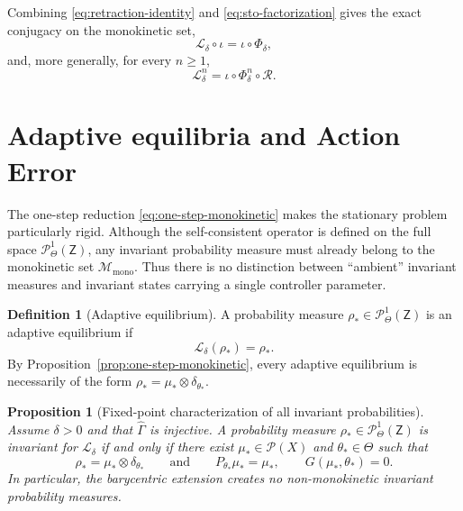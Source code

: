 \documentclass[11pt]{article}
\newtheorem{proposition}[theorem]{Proposition}
\theoremstyle{definition}
\newtheorem{definition}[theorem]{Definition}
\theoremstyle{remark}
\newcommand{\Prob}{\mathcal{P}}
\newcommand{\ProbThetaOne}{\mathcal{P}_{\Theta}^{1}}
\newcommand{\STO}{\mathcal{L}}
\newcommand{\ThetaSet}{\Theta}
\newcommand{\Gammahat}{\widehat{\Gamma}}
\newcommand{\Z}{\mathsf{Z}}
\newcommand{\Mmono}{\mathscr{M}_{\mathrm{mono}}}
\begin{document}
Combining \eqref{eq:retraction-identity} and \eqref{eq:sto-factorization}
gives the exact conjugacy on the monokinetic set,
\begin{equation}
  \boxed{
  \STO_\delta\circ\iota
  =\iota\circ\Phi_\delta,}
  \label{eq:conjugacy}
\end{equation}
and, more generally, for every \(n\geq1\),
\begin{equation}
  \boxed{
  \STO_\delta^n
  =\iota\circ\Phi_\delta^n\circ\mathcal R.}
  \label{eq:iterate-factorization}
\end{equation}



\section{Adaptive equilibria and Action Error}\label{3}

The one-step reduction \eqref{eq:one-step-monokinetic} makes the stationary
problem particularly rigid.  Although the self-consistent operator is defined
on the full space \(\ProbThetaOne(\Z)\), any invariant probability measure must already
belong to the monokinetic set \(\Mmono\).  Thus there is no distinction between
``ambient'' invariant measures and invariant states carrying a single
controller parameter.

\begin{definition}[Adaptive equilibrium]
A probability measure \(\rho_*\in\ProbThetaOne(\Z)\) is an adaptive equilibrium if
\[
  \STO_\delta(\rho_*)=\rho_*.
\]
By Proposition~\ref{prop:one-step-monokinetic}, every adaptive equilibrium is
necessarily of the form
\(\rho_*=\mu_*\otimes\delta_{\theta_*}\).
\end{definition}

\begin{proposition}[Fixed-point characterization of all invariant probabilities]
\label{prop:all-fixed-points}
Assume \(\delta>0\) and that \(\Gammahat\) is injective.  A probability measure
\(\rho_*\in\ProbThetaOne(\Z)\) is invariant for \(\STO_\delta\) if and only if there
exist \(\mu_*\in\Prob(X)\) and \(\theta_*\in\ThetaSet\) such that
\begin{equation}
  \rho_*=\mu_*\otimes\delta_{\theta_*}
  \qquad\text{and}\qquad
  \boxed{
  P_{\theta_*}\mu_*=\mu_* ,
  \qquad
  G(\mu_*,\theta_*)=0.}
  \label{eq:adaptive-equilibrium}
\end{equation}
In particular, the barycentric extension creates no non-monokinetic invariant
probability measures.
\end{proposition}
\end{document}
